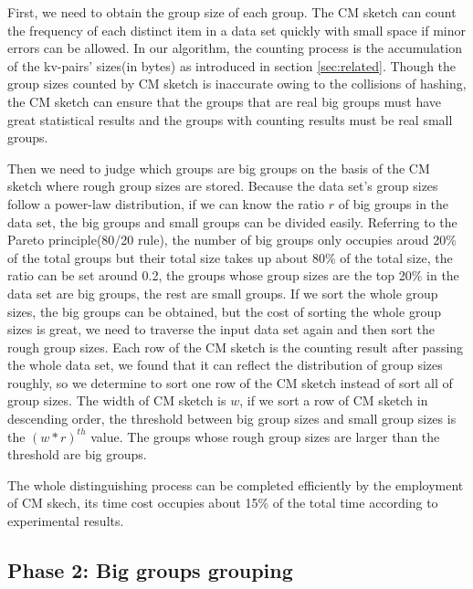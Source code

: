First, we need to obtain the group size of each group. The CM sketch can count the frequency of each distinct item in a data set quickly with small space if minor errors can be allowed. In our algorithm, the counting process is the accumulation of the kv-pairs' sizes(in bytes) as introduced in section \ref{sec:related}. Though the group sizes counted by CM sketch is inaccurate owing to the collisions of hashing, the CM sketch can ensure that the groups that are real big groups must have great statistical results and the groups with counting results must be real small groups.   

Then we need to judge which groups are big groups on the basis of the CM sketch where rough group sizes are stored. Because the data set's group sizes follow a power-law distribution, if we can know the ratio $r$ of big groups in the data set, the big groups and small groups can be divided easily. Referring to the Pareto principle(80/20 rule), the number of big groups only occupies aroud 20\% of the total groups but their total size takes up about 80\% of the total size, the ratio can be set around 0.2, the groups whose group sizes are the top 20\% in the data set are big groups, the rest are small groups. If we sort the whole group sizes, the big groups can be obtained, but the cost of sorting the whole group sizes is great, we need to traverse the input data set again and then sort the rough group sizes. Each row of the CM sketch is the counting result after passing the whole data set, we found that it can reflect the distribution of group sizes roughly, so we determine to sort one row of the CM sketch instead of sort all of group sizes. The width of CM sketch is $w$, if we sort a row of CM sketch in descending order, the threshold between big group sizes and small group sizes is the ${(w*r)}^{th}$ value. The groups whose rough group sizes are larger than the threshold are big groups. 

The whole distinguishing process can be completed efficiently by the employment of CM skech, its time cost occupies about 15\% of the total time according to experimental results.

\subsection{Phase 2: Big groups grouping} 

